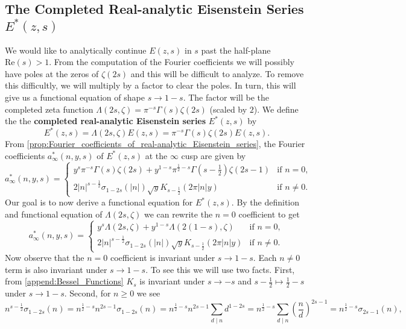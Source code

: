 \documentclass[12pt]{book}
\theoremstyle{definition}\newframedtheorem{method}{Method}
\newcommand{\z}{\zeta}
\newcommand{\s}{\sigma}
\newcommand{\G}{\Gamma}
\renewcommand{\L}{\Lambda}
\newcommand{\<}{\langle}
\renewcommand{\>}{\rangle}
\renewcommand{\Re}{\mathrm{Re}}
\begin{document}
    \subsection*{The Completed Real-analytic Eisenstein Series \texorpdfstring{$E^{\ast}(z,s)$}{E*(z,s)}}
      We would like to analytically continue $E(z,s)$ in $s$ past the half-plane $\Re(s) > 1$. From the computation of the Fourier coefficients we will possibly have poles at the zeros of $\z(2s)$ and this will be difficult to analyze. To remove this difficultly, we will multiply by a factor to clear the poles. In turn, this will give us a functional equation of shape $s \to 1-s$. The factor will be the completed zeta function $\L(2s,\z) = \pi^{-s}\G(s)\z(2s)$ (scaled by $2$). We define the the \textbf{completed real-analytic Eisenstein series} $E^{\ast}(z,s)$ by
      \[
        E^{\ast}(z,s) = \L(2s,\z)E(z,s) = \pi^{-s}\G(s)\z(2s)E(z,s).
      \]
      From \cref{prop:Fourier_coefficients_of_real-analytic_Eisenstein_series}, the Fourier coefficients $a_{\infty}^{\ast}(n,y,s)$ of $E^{\ast}(z,s)$ at the $\infty$ cusp are given by
      \[
        a_{\infty}^{\ast}(n,y,s) = \begin{cases} y^{s}\pi^{-s}\G(s)\z(2s)+y^{1-s}\pi^{\frac{1}{2}-s}\G(s-\frac{1}{2})\z(2s-1) & \text{if $n = 0$}, \\ 2|n|^{s-\frac{1}{2}}\s_{1-2s}(|n|)\sqrt{y}K_{s-\frac{1}{2}}(2\pi|n|y) & \text{if $n \neq 0$}. \end{cases}
      \]
      Our goal is to now derive a functional equation for $E^{\ast}(z,s)$. By the definition and functional equation of $\L(2s,\z)$ we can rewrite the $n = 0$ coefficient to get
      \[
        a_{\infty}^{\ast}(n,y,s) = \begin{cases} y^{s}\L(2s,\z)+y^{1-s}\L(2(1-s),\z) & \text{if $n = 0$}, \\ 2|n|^{s-\frac{1}{2}}\s_{1-2s}(|n|)\sqrt{y}K_{s-\frac{1}{2}}(2\pi|n|y) & \text{if $n \neq 0$}. \end{cases}
      \]
      Now observe that the $n = 0$ coefficient is invariant under $s \to 1-s$. Each $n \neq 0$ term is also invariant under $s \to 1-s$. To see this we will use two facts. First, from \cref{append:Bessel_Functions} $K_{s}$ is invariant under $s \to -s$ and $s-\frac{1}{2} \mapsto \frac{1}{2}-s$ under $s \to 1-s$. Second, for $n \ge 0$ we see
      \[
        n^{s-\frac{1}{2}}\s_{1-2s}(n) = n^{\frac{1}{2}-s}n^{2s-1}\s_{1-2s}(n) = n^{\frac{1}{2}-s}n^{2s-1}\sum_{d \mid n}d^{1-2s} = n^{\frac{1}{2}-s}\sum_{d \mid n}\left(\frac{n}{d}\right)^{2s-1} = n^{\frac{1}{2}-s}\s_{2s-1}(n),
      \]
\end{document}

